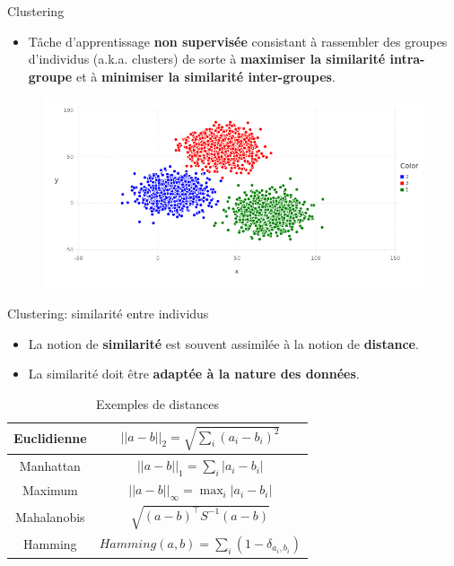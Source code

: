 \documentclass[hyperref={pdfpagelabels=false}]{beamer}
\begin{document}
    \begin{frame}{Clustering}
        \begin{itemize}
            \item Tâche d'apprentissage \textbf{non supervisée} consistant à 
                rassembler des groupes d'individus (a.k.a. clusters) de sorte à 
                \textbf{maximiser la similarité intra-groupe} et à 
                \textbf{minimiser la similarité inter-groupes}.
        \end{itemize}

        \begin{figure}[b]
            \centering
            \includegraphics[scale=.25]{clustering}
        \end{figure}
    \end{frame}

    \begin{frame}{Clustering: similarité entre individus}
        \begin{itemize}
            \item La notion de \textbf{similarité} est souvent assimilée à la 
                notion de \textbf{distance}.
            \item La similarité doit être \textbf{adaptée à la nature des 
                données}.
        \end{itemize}

        \begin{table}[!h]
            \centering
               \begin{tabular}{cc}
               \hline
               Euclidienne & $ ||a - b ||_2  = \sqrt{ \sum_{i} (a_i - b_i)^2} $    \\	
               \hline
               Manhattan & $ ||a - b ||_1  = \sum_{i} |a_i - b_i|$    \\	
               \hline
               Maximum & $ ||a - b ||_{\infty}  = \mathop\mathrm{max}_{i} |a_i - b_i|$    \\	
               \hline 
               Mahalanobis & $ \sqrt{(a-b)^\top S^{-1}(a-b)}$    \\	
               \hline  
               Hamming & $ Hamming(a,b) = \sum_i  (1- \delta_{a_i,b_i}) $   \\	
               \hline           
               \end{tabular}
               \caption{Exemples de distances}
           \end{table}
    \end{frame}
\end{document}
